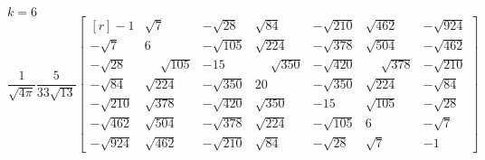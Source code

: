 $k=6$
\begin{equation} \label{eq:Gend}
\frac{1}{\sqrt{4\pi}} \frac{5}{33\sqrt{13}}
\begin{bmatrix*}[r]
-1 & \sqrt{7} & -\sqrt{28} & \sqrt{84} & -\sqrt{210} & \sqrt{462} & -\sqrt{924} \\
-\sqrt{7} & 6 & -\sqrt{105} & \sqrt{224} & -\sqrt{378} & \sqrt{504} & -\sqrt{462} \\
-\sqrt{28} & \phantom{-}\sqrt{105} & -15 & \phantom{-}\sqrt{350} & -\sqrt{420} & \phantom{-}\sqrt{378} & -\sqrt{210} \\
-\sqrt{84} & \sqrt{224} & -\sqrt{350} & 20 & -\sqrt{350} & \sqrt{224} & -\sqrt{84} \\
-\sqrt{210} & \sqrt{378} & -\sqrt{420} & \sqrt{350} & -15 & \sqrt{105} & -\sqrt{28} \\
-\sqrt{462} & \sqrt{504} & -\sqrt{378} & \sqrt{224} & -\sqrt{105} & 6 & -\sqrt{7} \\
-\sqrt{924} & \sqrt{462} & -\sqrt{210} & \sqrt{84} & -\sqrt{28} & \sqrt{7} & -1
\end{bmatrix*}
\end{equation}
